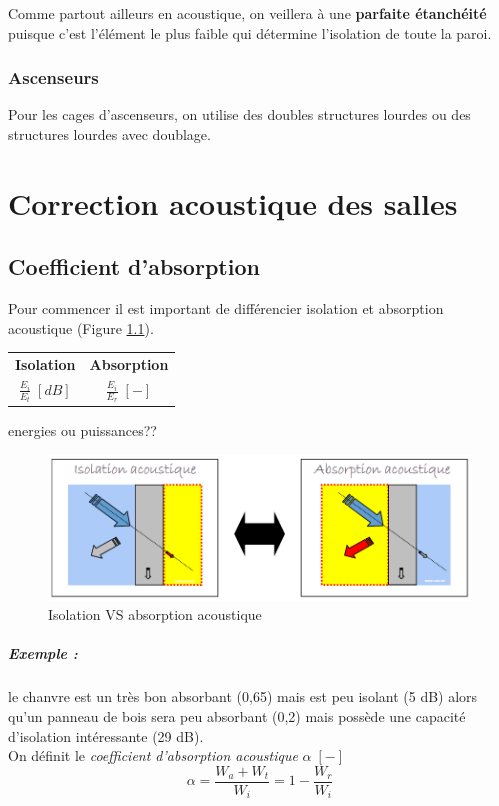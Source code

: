 \documentclass[11pt]{report}
\begin{document}
Comme partout ailleurs en acoustique, on veillera à une \textbf{parfaite étanchéité} puisque c'est l'élément le plus faible qui détermine l'isolation de toute la paroi.

\subsection{Ascenseurs}
Pour les cages d'ascenseurs, on utilise des doubles structures lourdes ou des structures lourdes avec doublage.



\chapter{Correction acoustique des salles}
\section{Coefficient d'absorption}

Pour commencer il est important de différencier isolation et absorption acoustique (Figure \ref{ene}).


\begin{center}
\begin{tabular}{cc}
\textbf{Isolation} & \textbf{Absorption}\\
$\frac{E_i}{E_t}\;[dB]$ & $\frac{E_i}{E_r}\;[-]$
\end{tabular}
\end{center}
energies ou puissances??


\begin{figure}[ht]
\centering
\includegraphics[width=0.5\linewidth]{ene}
\caption{Isolation VS absorption acoustique}
\label{ene}
\end{figure}

\paragraph{Exemple :} le chanvre est un très bon absorbant (0,65) mais est peu isolant (5 dB) alors qu'un panneau de bois sera peu absorbant (0,2) mais possède une capacité d'isolation intéressante (29 dB).\\


On définit le \textit{coefficient d'absorption acoustique} $\alpha\;[-]$ 
$$\alpha = \frac{W_a+W_t}{W_i} = 1 - \frac{W_r}{W_i}$$
\end{document}
